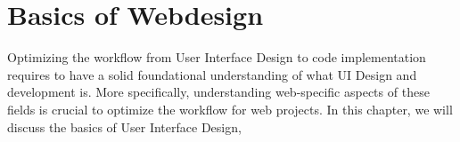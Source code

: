 \section{Basics of Webdesign}
Optimizing the workflow from User Interface Design to code implementation requires to have a solid
foundational understanding of what UI Design and development is. More specifically, understanding
web-specific aspects of these fields is crucial to optimize the workflow for web projects. In this
chapter, we will discuss the basics of User Interface Design,





